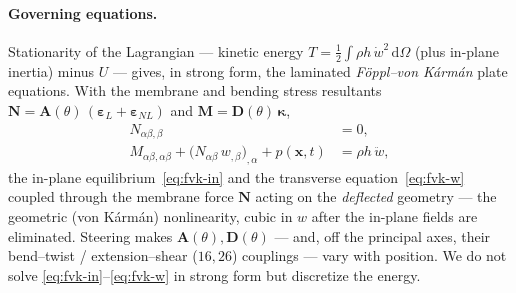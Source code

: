 \documentclass[11pt]{article}
\newcommand{\dd}{\mathrm{d}}
\begin{document}
\paragraph{Governing equations.} Stationarity of the Lagrangian --- kinetic energy
$T=\tfrac12\!\int\!\rho h\,\dot w^2\,\dd\Omega$ (plus in-plane inertia) minus $U$ ---
gives, in strong form, the laminated \emph{F\"oppl--von K\'arm\'an} plate equations.
With the membrane and bending stress resultants
$\bm N=\bm A(\theta)\,(\bm\varepsilon_L+\bm\varepsilon_{NL})$ and
$\bm M=\bm D(\theta)\,\bm\kappa$,
\begin{align}
N_{\alpha\beta,\beta}&=0,
\label{eq:fvk-in}\\[2pt]
M_{\alpha\beta,\alpha\beta}+\big(N_{\alpha\beta}\,w_{,\beta}\big)_{,\alpha}+p(\bm x,t)
&=\rho h\,\ddot w,
\label{eq:fvk-w}
\end{align}
the in-plane equilibrium~\eqref{eq:fvk-in} and the transverse
equation~\eqref{eq:fvk-w} coupled through the membrane force $\bm N$ acting on the
\emph{deflected} geometry --- the geometric (von K\'arm\'an) nonlinearity, cubic in
$w$ after the in-plane fields are eliminated. Steering makes
$\bm A(\theta),\bm D(\theta)$ --- and, off the principal axes, their bend--twist /
extension--shear ($16,26$) couplings --- vary with position. We do not solve
\eqref{eq:fvk-in}--\eqref{eq:fvk-w} in strong form but discretize the energy.
\end{document}
